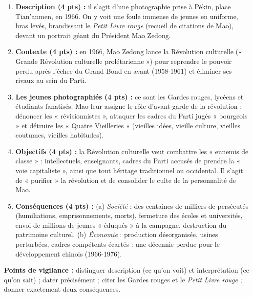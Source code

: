 \documentclass[11pt]{article}
\newcommand{\cle}[1]{{\popxbold\color{popdark}#1}}
\begin{document}
\begin{corrige}
\begin{enumerate}
\item \textbf{Description (4 pts) :} il s'agit d'une photographie prise à Pékin, place Tian'anmen, en 1966. On y voit une foule immense de jeunes en uniforme, bras levés, brandissant le \emph{Petit Livre rouge} (recueil de citations de Mao), devant un portrait géant du Président Mao Zedong.
\item \textbf{Contexte (4 pts) :} en 1966, Mao Zedong lance la \cle{Révolution culturelle} (« Grande Révolution culturelle prolétarienne ») pour reprendre le pouvoir perdu après l'échec du Grand Bond en avant (1958-1961) et éliminer ses rivaux au sein du Parti.
\item \textbf{Les jeunes photographiés (4 pts) :} ce sont les \cle{Gardes rouges}, lycéens et étudiants fanatisés. Mao leur assigne le rôle d'avant-garde de la révolution : dénoncer les « révisionnistes », attaquer les cadres du Parti jugés « bourgeois » et détruire les « Quatre Vieilleries » (vieilles idées, vieille culture, vieilles coutumes, vieilles habitudes).
\item \textbf{Objectifs (4 pts) :} la Révolution culturelle veut combattre les « ennemis de classe » : intellectuels, enseignants, cadres du Parti accusés de prendre la « voie capitaliste », ainsi que tout héritage traditionnel ou occidental. Il s'agit de « purifier » la révolution et de consolider le culte de la personnalité de Mao.
\item \textbf{Conséquences (4 pts) :} (a) \emph{Société} : des centaines de milliers de persécutés (humiliations, emprisonnements, morts), fermeture des écoles et universités, envoi de millions de jeunes « éduqués » à la campagne, destruction du patrimoine culturel. (b) \emph{Économie} : production désorganisée, usines perturbées, cadres compétents écartés : une décennie perdue pour le développement chinois (1966-1976).
\end{enumerate}
\textbf{Points de vigilance :} distinguer description (ce qu'on voit) et interprétation (ce qu'on sait) ; dater précisément ; citer les Gardes rouges et le \emph{Petit Livre rouge} ; donner exactement deux conséquences.
\end{corrige}
\end{document}
